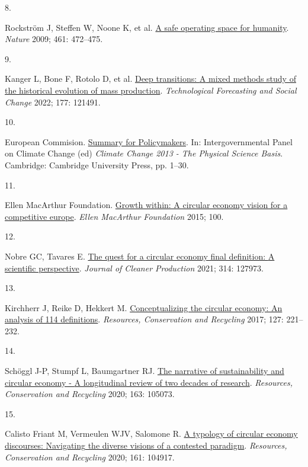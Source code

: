 \documentclass[
  11pt,
  a4paperpaper,
  onecolumn]{article}
\newlength{\cslhangindent}
\newlength{\csllabelwidth}
\newlength{\cslentryspacingunit} %
\newenvironment{CSLReferences}[2] %
 {%
  \setlength{\parindent}{0pt}
  \ifodd #1
  \let\oldpar\par
  \def\par{\hangindent=\cslhangindent\oldpar}
  \fi
  \setlength{\parskip}{#2\cslentryspacingunit}
 }%
 {}
\newcommand{\CSLLeftMargin}[1]{\parbox[t]{\csllabelwidth}{#1}}
\newcommand{\CSLRightInline}[1]{\parbox[t]{\linewidth - \csllabelwidth}{#1}\break}
\begin{document}
\begin{CSLReferences}{0}{0}
\leavevmode{}%
\CSLLeftMargin{8. }%
\CSLRightInline{Rockström J, Steffen W, Noone K, et al.
\href{https://doi.org/10.1038/461472a}{A safe operating space for
humanity}. \emph{Nature} 2009; 461: 472--475.}

\leavevmode{}%
\CSLLeftMargin{9. }%
\CSLRightInline{Kanger L, Bone F, Rotolo D, et al.
\href{https://doi.org/10.1016/j.techfore.2022.121491}{Deep transitions:
{A} mixed methods study of the historical evolution of mass production}.
\emph{Technological Forecasting and Social Change} 2022; 177: 121491.}

\leavevmode{}%
\CSLLeftMargin{10. }%
\CSLRightInline{European Commision.
\href{https://doi.org/10.1017/CBO9781107415324.004}{Summary for
{Policymakers}}. In: Intergovernmental Panel on Climate Change (ed)
\emph{Climate {Change} 2013 - {The Physical Science Basis}}.
{Cambridge}: {Cambridge University Press}, pp. 1--30.}

\leavevmode{}%
\CSLLeftMargin{11. }%
\CSLRightInline{Ellen MacArthur Foundation.
\href{https://doi.org/Article}{Growth within: A circular economy vision
for a competitive europe}. \emph{Ellen MacArthur Foundation} 2015; 100.}

\leavevmode{}%
\CSLLeftMargin{12. }%
\CSLRightInline{Nobre GC, Tavares E.
\href{https://doi.org/10.1016/j.jclepro.2021.127973}{The quest for a
circular economy final definition: {A} scientific perspective}.
\emph{Journal of Cleaner Production} 2021; 314: 127973.}

\leavevmode{}%
\CSLLeftMargin{13. }%
\CSLRightInline{Kirchherr J, Reike D, Hekkert M.
\href{https://doi.org/10.1016/j.resconrec.2017.09.005}{Conceptualizing
the circular economy: {An} analysis of 114 definitions}.
\emph{Resources, Conservation and Recycling} 2017; 127: 221--232.}

\leavevmode{}%
\CSLLeftMargin{14. }%
\CSLRightInline{Schöggl J-P, Stumpf L, Baumgartner RJ.
\href{https://doi.org/10.1016/j.resconrec.2020.105073}{The narrative of
sustainability and circular economy - {A} longitudinal review of two
decades of research}. \emph{Resources, Conservation and Recycling} 2020;
163: 105073.}

\leavevmode{}%
\CSLLeftMargin{15. }%
\CSLRightInline{Calisto Friant M, Vermeulen WJV, Salomone R.
\href{https://doi.org/10.1016/j.resconrec.2020.104917}{A typology of
circular economy discourses: {Navigating} the diverse visions of a
contested paradigm}. \emph{Resources, Conservation and Recycling} 2020;
161: 104917.}


\end{CSLReferences}
\end{document}
